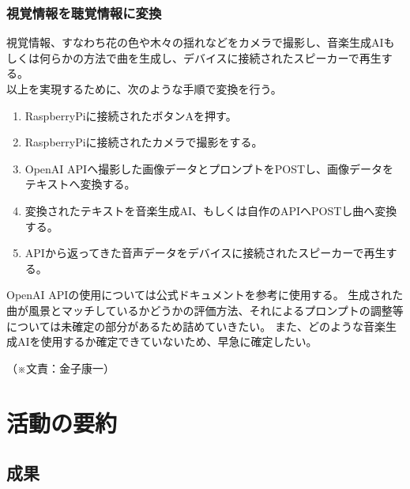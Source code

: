 \documentclass[11pt,a4paper]{report}
\newcommand{\Writer}[1]{
  \normalsize
  \begin{flushright}
    （※文責：#1）
  \end{flushright}
}
\begin{document}
\subsection{視覚情報を聴覚情報に変換}
\label{convertMusic}
\noindent\space
視覚情報、すなわち花の色や木々の揺れなどをカメラで撮影し、音楽生成AIもしくは何らかの方法で曲を生成し、デバイスに接続されたスピーカーで再生する。\\
以上を実現するために、次のような手順で変換を行う。
\begin{enumerate}
  \item RaspberryPiに接続されたボタンAを押す。
  \item RaspberryPiに接続されたカメラで撮影をする。
  \item OpenAI APIへ撮影した画像データとプロンプトをPOSTし、画像データをテキストへ変換する。
  \item 変換されたテキストを音楽生成AI、もしくは自作のAPIへPOSTし曲へ変換する。
  \item APIから返ってきた音声データをデバイスに接続されたスピーカーで再生する。
\end{enumerate} 
OpenAI APIの使用については公式ドキュメント\cite{OpenAIAPI}を参考に使用する。
生成された曲が風景とマッチしているかどうかの評価方法、それによるプロンプトの調整等については未確定の部分があるため詰めていきたい。
また、どのような音楽生成AIを使用するか確定できていないため、早急に確定したい。
\Writer{金子康一}

\chapter{活動の要約}
\section{成果}
\end{document}
